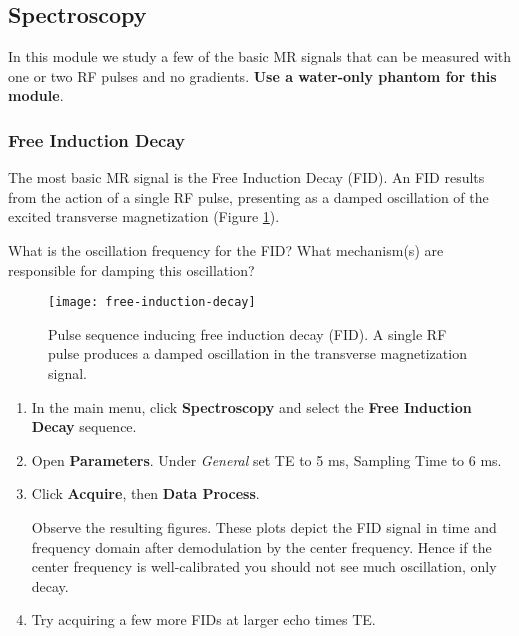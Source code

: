 \newpage
\subsection{Spectroscopy}

In this module we study a few of the basic MR signals that can be measured with one or two RF pulses and no gradients. \textbf{Use a water-only phantom for this module}.

\subsubsection{Free Induction Decay} \label{sec:fid}

The most basic MR signal is the Free Induction Decay (FID). An FID results from the action of a single RF pulse, presenting as a damped oscillation of the excited transverse magnetization (Figure \ref{fig:FID}). 

\vspace{5mm}

\noindent{}\color{red}
What is the oscillation frequency for the FID? What mechanism(s) are responsible for damping this oscillation?
\color{black}

\begin{figure}[h]
    \centering
    \texttt{[image: free-induction-decay]}
    \captionsetup{width=.9\textwidth}
    \caption{\label{fig:FID} Pulse sequence inducing free induction decay (FID). A single RF pulse produces a damped oscillation in the transverse magnetization signal.}
\end{figure}

\begin{enumerate}
    \item   In the main menu, click \textbf{Spectroscopy} and select the \textbf{Free Induction Decay} sequence.
    \item	Open \textbf{Parameters}. Under \emph{General} set TE to 5 ms, Sampling Time to 6 ms.
    \item	Click \textbf{Acquire}, then \textbf{Data Process}. 

Observe the resulting figures. These plots depict the FID signal in time and frequency domain after demodulation by the center frequency. Hence if the center frequency is well-calibrated you should not see much oscillation, only decay.

    \item Try acquiring a few more FIDs at larger echo times TE.

\end{enumerate}

